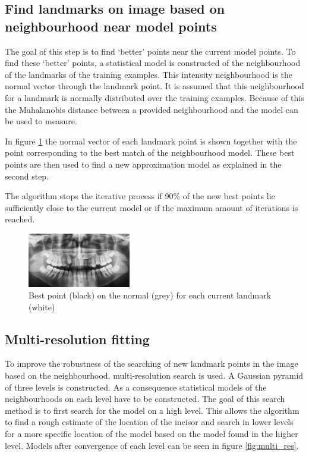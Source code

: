 \documentclass[a4paper,10pt]{article}
\begin{document}
\subsection{Find landmarks on image based on neighbourhood near model points}
The goal of this step is to find `better' points near the current model points. To find these `better' points, a statistical model is constructed of the neighbourhood of the landmarks of the training examples. This intensity neighbourhood is the normal vector through the landmark point. It is assumed that this neighbourhood for a landmark is normally distributed over the training examples. Because of this the Mahalanobis distance between a provided neighbourhood and the model can be used to measure.

In figure \ref{fig:normal_vector} the normal vector of each landmark point is shown together with the point corresponding to the best match of the neighbourhood model. These best points are then used to find a new approximation model as explained in the second step.

The algorithm stops the iterative process if 90\% of the new best points lie sufficiently close to the current model or if the maximum amount of iterations is reached.

\begin{figure}[htbp]
	\centering
	\includegraphics[width=0.4\textwidth, trim=17cm 2cm 21cm 13.5cm, clip]{normal_vectors}
	\caption{Best point (black) on the normal (grey) for each current landmark (white)}
	\label{fig:normal_vector}
\end{figure}

\subsection{Multi-resolution fitting}
To improve the robustness of the searching of new landmark points in the image based on the neighbourhood, multi-resolution search is used. A Gaussian pyramid of three levels is constructed. As a consequence statistical models of the neighbourhoods on each level have to be constructed. The goal of this search method is to first search for the model on a high level. This allows the algorithm to find a rough estimate of the location of the incisor and search in lower levels for a more specific location of the model based on the model found in the higher level. Models after convergence of each level can be seen in figure \ref{fig:multi_res}.
\end{document}

